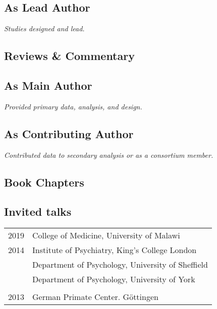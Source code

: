 \documentclass[11pt]{article}
\begin{document}
% 

\subsection*{As Lead Author}

\textit{Studies designed and lead.}

\printbibliography[type=article,keyword=lead,heading=none]

\subsection*{Reviews \& Commentary}

\printbibliography[type=article,keyword=review,heading=none]

\subsection*{As Main Author}

\textit{Provided primary data, analysis, and design.} 

\printbibliography[type=article,keyword=main,heading=none]

\subsection*{As Contributing Author}

\textit{Contributed data to secondary analysis or as a consortium member.}

\printbibliography[type=article,keyword=contrib,heading=none]

\subsection*{Book Chapters}

\printbibliography[type=inbook,heading=none]

\subsection*{Invited talks}

\begin{tabular}{p{3cm}p{12cm}}
	
2019 & College of Medicine, University of Malawi \\
	
2014 & Institute of Psychiatry, King's College London \\

     & Department of Psychology, University of Sheffield \\

    & Department of Psychology, University of York \\ \\

2013 & German Primate Center. Göttingen

\end{tabular}
\end{document}
